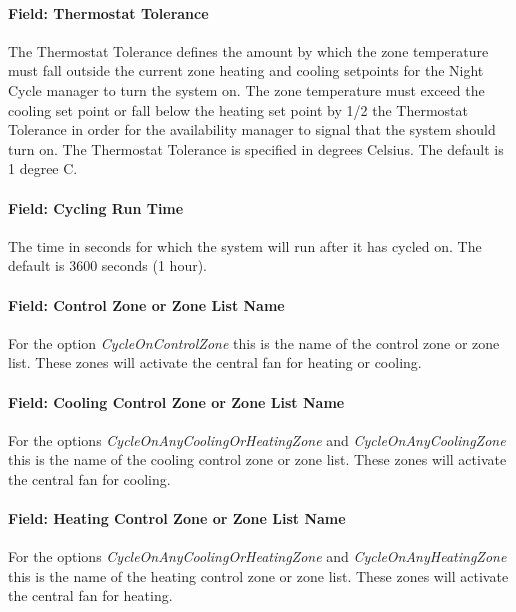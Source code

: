 \paragraph{Field: Thermostat Tolerance}\label{field-thermostat-tolerance}

The Thermostat Tolerance defines the amount by which the zone temperature must fall outside the current zone heating and cooling setpoints for the Night Cycle manager to turn the system on. The zone temperature must exceed the cooling set point or fall below the heating set point by 1/2 the Thermostat Tolerance in order for the availability manager to signal that the system should turn on. The Thermostat Tolerance is specified in degrees Celsius. The default is 1 degree C.

\paragraph{Field: Cycling Run Time}\label{field-cycling-run-time}

The time in seconds for which the system will run after it has cycled on. The default is 3600 seconds (1 hour).

\paragraph{Field: Control Zone or Zone List Name}\label{field-control-zone-or-zone-list-name}

For the option \emph{CycleOnControlZone} this is the name of the control zone or zone list. These zones will activate the central fan for heating or cooling.

\paragraph{Field: Cooling Control Zone or Zone List Name}\label{field-cooling-control-zone-or-zone-list-name}

For the options \emph{CycleOnAnyCoolingOrHeatingZone} and  \emph{CycleOnAnyCoolingZone}  this is the name of the cooling control zone or zone list. These zones will activate the central fan for cooling.

\paragraph{Field: Heating Control Zone or Zone List Name}\label{field-heating-control-zone-or-zone-list-name}

For the options \emph{CycleOnAnyCoolingOrHeatingZone} and  \emph{CycleOnAnyHeatingZone}  this is the name of the heating control zone or zone list. These zones will activate the central fan for heating.


